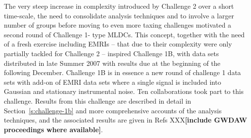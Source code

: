 \documentclass{iopart}
\begin{document}

The very steep increase in complexity introduced by Challenge 2 over a short time-scale, the need to consolidate analysis techniques and to involve a larger number of groups before moving to even more taxing challenges motivated a second round of Challenge 1- type MLDCs. This concept, together with the need of a fresh exercise including EMRIs -- that due to their complexity were only partially tackled for Challenge 2 -- inspired Challenge 1B, with data sets distributed in late Summer 2007 with results due at the beginning of the following December. Challenge 1B is in essence a new round of challenge 1 data sets with add-on of EMRI data sets where a single signal is included into Gaussian and stationary instrumental noise. Ten collaborations took part to this challenge. Results from this challenge are described in detail in Section~\ref{s:challenge-1b} and more comprehensive accounts of the analysis techniques, and the associated results are given in Refs XXX\textbf{[include GWDAW proceedings where available]}.
\end{document}

